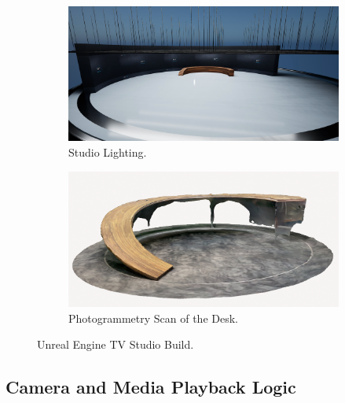 \documentclass[
  a4paper,  %
  twoside,  %
  bibliography=totoc,
  headsepline,
  cleardoublepage=empty,
  parskip=half,
  draft=false
]{scrbook}
\begin{document}
\begin{figure}[h]
  \begin{subfigure}{0.45\textwidth}
    \includegraphics[width=\linewidth]{graphics/unreal-engine/studio/studio-totale.png}
    \caption{Studio Lighting.}
  \end{subfigure}
  \begin{subfigure}{0.45\textwidth}
    \includegraphics[width=\linewidth]{graphics/unreal-engine/studio/Photogrammetry-Desk.png}
    \caption{Photogrammetry Scan of the Desk.}
    \label{fig:photogrammetry-desk}
  \end{subfigure}
  \caption{Unreal Engine TV Studio Build.}
  \label{fig:ue-studio-build}
\end{figure}

\subsection*{Camera and Media Playback Logic} 
\end{document}
